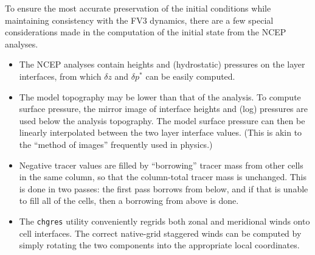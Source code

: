 \documentclass[10pt,letterpaper,margin=1in]{memoir}
\begin{document}
To ensure the most accurate preservation of the initial conditions while maintaining consistency with the FV3 dynamics, there are a few special considerations made in the computation of the initial state from the NCEP analyses.
\begin{itemize}
\item The NCEP analyses contain heights and (hydrostatic) pressures on the layer interfaces, from which $\delta z$ and $\delta p^*$ can be easily computed.
\item The model topography may be lower than that of the analysis. To compute surface pressure, the mirror image of interface heights and (log) pressures are used below the analysis topography. The model surface pressure can then be linearly interpolated between the two layer interface values. (This is akin to the ``method of images'' frequently used in physics.)
\item Negative tracer values are filled by ``borrowing'' tracer mass from other cells in the same column, so that the column-total tracer mass is unchanged. This is done in two passes: the first pass borrows from below, and if that is unable to fill all of the cells, then a borrowing from above is done. 
\item The \texttt{chgres} utility conveniently regrids both zonal and meridional winds onto cell interfaces. The correct native-grid staggered winds can be computed by simply rotating the two components into the appropriate local coordinates.
\end{itemize}
\end{document}
